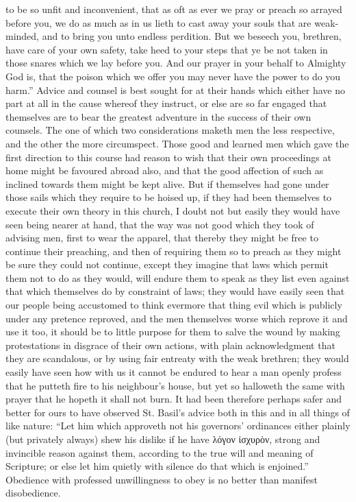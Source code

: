 to be so unfit and inconvenient, that as oft as ever we pray or preach so arrayed before you, we do as much as in us lieth to cast away your souls that are weak-minded, and to bring you unto endless perdition. But we beseech you, brethren, have care of your own safety, take heed to your steps that ye be not taken in those snares which we lay before you. And our prayer in your behalf to Almighty God is, that the poison which we offer you may never have the power to do you harm.”
Advice and counsel is best sought for at their hands which either have no part at all in the cause whereof they instruct, or else are so far engaged that themselves are to bear the greatest adventure in the success of their own counsels. The one of which two considerations maketh men the less respective, and the other the more circumspect. Those good and learned men which gave the first direction to this course had reason to wish that their own proceedings at home might be favoured abroad also, and that the good affection of such as inclined towards them might be kept alive. But if themselves had gone under those sails which they require to be hoised up, if they had been themselves to execute their own theory in this church, I doubt not but easily they would have seen being nearer at hand, that the way was not good which they took of advising men, first to wear the apparel, that thereby they might be free to continue their preaching, and then of requiring them so to preach as they might be sure they could not continue, except they imagine that laws which permit them not to do as they would, will endure them to speak as they list even against that which themselves do by constraint of laws; they would have easily seen that our people being accustomed to think evermore that thing evil which is publicly under any pretence reproved, and the men themselves worse which reprove it and use it too, it should be to little purpose for them to salve the wound by making protestations in disgrace of their own actions, with plain acknowledgment that they are scandalous, or by using fair  entreaty with the weak brethren; they would easily have seen how with us it cannot be endured to hear a man openly profess that he putteth fire to his neighbour’s house, but yet so halloweth the same with prayer that he hopeth it shall not burn. It had been therefore perhaps safer and better for ours to have observed St. Basil’s advice both in this and in all things of like nature: “Let him which approveth not his governors’ ordinances either plainly (but privately always) shew his dislike if he have λόγον ἰσχυρὸν, strong and invincible reason against them, according to the true will and meaning of Scripture; or else let him quietly with silence do that which is enjoined.” Obedience with professed unwillingness to obey is no better than manifest disobedience.

